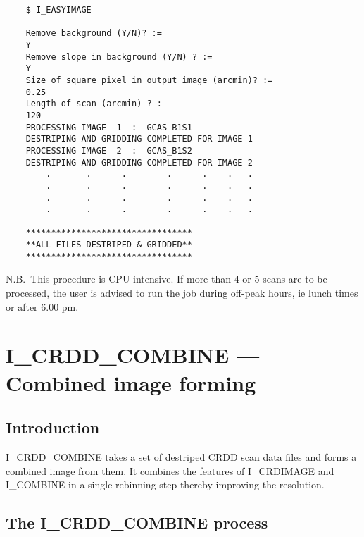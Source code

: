 \begin {verbatim}
    $ I_EASYIMAGE

    Remove background (Y/N)? :=
    Y
    Remove slope in background (Y/N) ? :=
    Y
    Size of square pixel in output image (arcmin)? :=
    0.25
    Length of scan (arcmin) ? :-
    120
    PROCESSING IMAGE  1  :  GCAS_B1S1
    DESTRIPING AND GRIDDING COMPLETED FOR IMAGE 1
    PROCESSING IMAGE  2  :  GCAS_B1S2
    DESTRIPING AND GRIDDING COMPLETED FOR IMAGE 2
        .       .      .        .      .    .   .
        .       .      .        .      .    .   .
        .       .      .        .      .    .   .
        .       .      .        .      .    .   .

    *********************************
    **ALL FILES DESTRIPED & GRIDDED**
    *********************************
\end{verbatim}
N.B.\ This procedure is CPU intensive.
If more than 4 or 5 scans are to be processed, the user is advised to run the
job during off-peak hours, ie lunch times or after 6.00 pm.
\pagebreak

\section{I\_CRDD\_COMBINE --- Combined image forming}

\subsection {Introduction}

I\_CRDD\_COMBINE takes a set of destriped CRDD scan data files and forms a
combined image from them. It combines the features of I\_CRDIMAGE and I\_COMBINE
in a single rebinning step thereby improving the resolution.

\subsection {The I\_CRDD\_COMBINE process}

